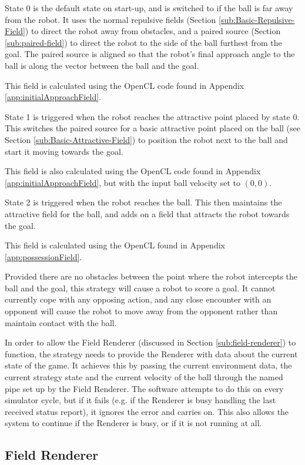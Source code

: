 \documentclass[10pt]{article}
\begin{document}
State 0 is the default state on start-up, and is switched to if the ball is far
away from the robot.  It uses the normal repulsive fields (Section
\ref{sub:Basic-Repulsive-Field}) to direct the robot away from obstacles, and a
paired source (Section \ref{sub:paired-field}) to direct the robot to the side
of the ball furthest from the goal.  The paired source is aligned so that the
robot's final approach angle to the ball is along the vector between the ball
and the goal.

This field is calculated using the OpenCL code found in Appendix
\ref{app:initialApproachField}.

State 1 is triggered when the robot reaches the attractive point placed by state
0.  This switches the paired source for a basic attractive point placed on the
ball (see Section \ref{sub:Basic-Attractive-Field}) to position the robot next
to the ball and start it moving towards the goal.

This field is also calculated using the OpenCL code found in Appendix
\ref{app:initialApproachField}, but with the input ball velocity set to
$\left(0,0\right)$.

State 2 is triggered when the robot reaches the ball.  This then maintains the
attractive field for the ball, and adds on a field that attracts the robot
towards the goal.

This field is calculated using the OpenCL found in Appendix
\ref{app:possessionField}.

Provided there are no obstacles between the point where the robot intercepts the
ball and the goal, this strategy will cause a robot to score a goal.  It cannot
currently cope with any opposing action, and any close encounter with an
opponent will cause the robot to move away from the opponent rather than
maintain contact with the ball.

In order to allow the Field Renderer (discussed in Section
\ref{sub:field-renderer}) to function, the strategy needs to provide the
Renderer with data about the current state of the game.  It achieves this by
passing the current environment data, the current strategy state and the current
velocity of the ball through the named pipe set up by the Field Renderer.  The
software attempts to do this on every simulator cycle, but if it fails (e.g. if
the Renderer is busy handling the last received status report), it ignores the
error and carries on.  This also allows the system to continue if the Renderer
is busy, or if it is not running at all.

\subsection{Field Renderer\label{sub:field-renderer}}
\end{document}
